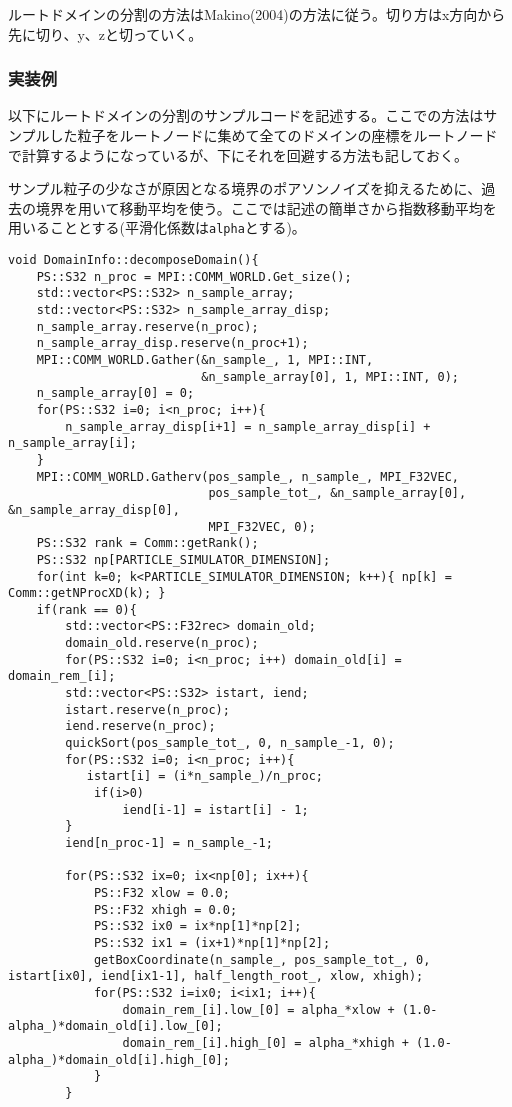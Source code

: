 ルートドメインの分割の方法はMakino(2004)の方法に従う。切り方はx方向から
先に切り、y、zと切っていく。

\subsubsection{実装例}

以下にルートドメインの分割のサンプルコードを記述する。ここでの方法はサ
ンプルした粒子をルートノードに集めて全てのドメインの座標をルートノード
で計算するようになっているが、下にそれを回避する方法も記しておく。

サンプル粒子の少なさが原因となる境界のポアソンノイズを抑えるために、過
去の境界を用いて移動平均を使う。ここでは記述の簡単さから指数移動平均を
用いることとする(平滑化係数は\verb|alpha|とする)。

\begin{lstlisting}[caption=ルートドメインの分割]
void DomainInfo::decomposeDomain(){
    PS::S32 n_proc = MPI::COMM_WORLD.Get_size();
    std::vector<PS::S32> n_sample_array;
    std::vector<PS::S32> n_sample_array_disp;
    n_sample_array.reserve(n_proc);
    n_sample_array_disp.reserve(n_proc+1);
    MPI::COMM_WORLD.Gather(&n_sample_, 1, MPI::INT, 
                           &n_sample_array[0], 1, MPI::INT, 0);
    n_sample_array[0] = 0;
    for(PS::S32 i=0; i<n_proc; i++){
        n_sample_array_disp[i+1] = n_sample_array_disp[i] + n_sample_array[i];
    }
    MPI::COMM_WORLD.Gatherv(pos_sample_, n_sample_, MPI_F32VEC, 
                            pos_sample_tot_, &n_sample_array[0], &n_sample_array_disp[0],
                            MPI_F32VEC, 0);
    PS::S32 rank = Comm::getRank();
    PS::S32 np[PARTICLE_SIMULATOR_DIMENSION];
    for(int k=0; k<PARTICLE_SIMULATOR_DIMENSION; k++){ np[k] = Comm::getNProcXD(k); }
    if(rank == 0){
        std::vector<PS::F32rec> domain_old;
        domain_old.reserve(n_proc);
        for(PS::S32 i=0; i<n_proc; i++) domain_old[i] = domain_rem_[i];
        std::vector<PS::S32> istart, iend;
        istart.reserve(n_proc);
        iend.reserve(n_proc);
        quickSort(pos_sample_tot_, 0, n_sample_-1, 0);
        for(PS::S32 i=0; i<n_proc; i++){
           istart[i] = (i*n_sample_)/n_proc;
            if(i>0)
                iend[i-1] = istart[i] - 1;
        }
        iend[n_proc-1] = n_sample_-1;

        for(PS::S32 ix=0; ix<np[0]; ix++){
            PS::F32 xlow = 0.0; 
            PS::F32 xhigh = 0.0;
            PS::S32 ix0 = ix*np[1]*np[2];
            PS::S32 ix1 = (ix+1)*np[1]*np[2];
            getBoxCoordinate(n_sample_, pos_sample_tot_, 0, istart[ix0], iend[ix1-1], half_length_root_, xlow, xhigh);
            for(PS::S32 i=ix0; i<ix1; i++){
                domain_rem_[i].low_[0] = alpha_*xlow + (1.0-alpha_)*domain_old[i].low_[0];
                domain_rem_[i].high_[0] = alpha_*xhigh + (1.0-alpha_)*domain_old[i].high_[0];
            }
        }


\end{lstlisting}
